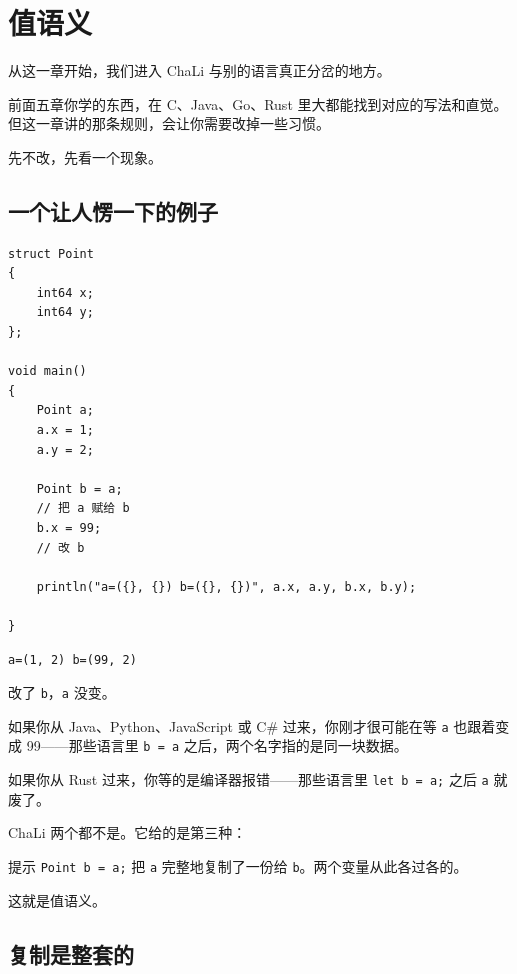 \chapter{值语义}
\label{ch:06}

从这一章开始，我们进入 ChaLi 与别的语言真正分岔的地方。

前面五章你学的东西，在 C、Java、Go、Rust 里大都能找到对应的写法和直觉。但这一章讲的那条规则，会让你需要改掉一些习惯。

先不改，先看一个现象。

\section{一个让人愣一下的例子}

\par
\medskip
\begin{lstlisting}[style=chali]
struct Point
{
    int64 x;
    int64 y;
};

void main()
{
    Point a;
    a.x = 1;
    a.y = 2;

    Point b = a;
    // 把 a 赋给 b
    b.x = 99;
    // 改 b

    println("a=({}, {}) b=({}, {})", a.x, a.y, b.x, b.y);

}
\end{lstlisting}
\par
\medskip

\par
\medskip
\begin{lstlisting}[style=out]
a=(1, 2) b=(99, 2)
\end{lstlisting}
\par
\medskip

改了 \texttt{b}，\texttt{a} 没变。

如果你从 Java、Python、JavaScript 或 C\# 过来，你刚才很可能在等 \texttt{a} 也跟着变成 99——那些语言里 \texttt{b =\allowbreak{} a} 之后，两个名字指的是同一块数据。

如果你从 Rust 过来，你等的是编译器报错——那些语言里 \texttt{let b =\allowbreak{} a;} 之后 \texttt{a} 就废了。

ChaLi 两个都不是。它给的是第三种：

\begin{tip}{提示}
\texttt{Point b =\allowbreak{} a;} 把 \texttt{a} 完整地复制了一份给 \texttt{b}。两个变量从此各过各的。
\end{tip}

这就是值语义。

\section{复制是整套的}

